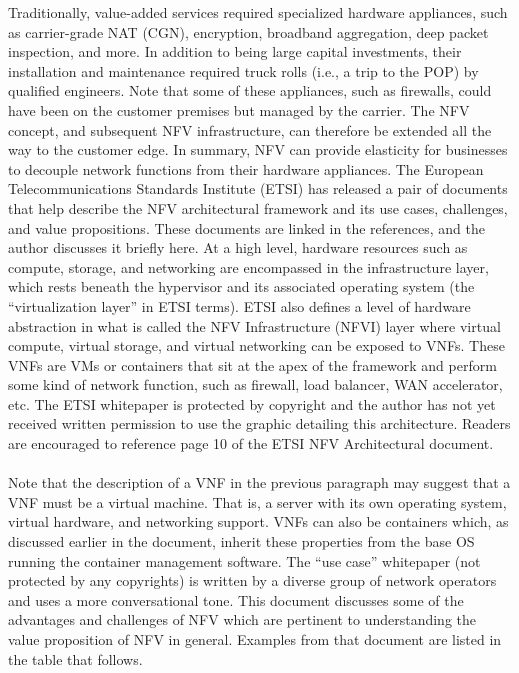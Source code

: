 Traditionally, value-added services required specialized hardware appliances,
such as carrier-grade NAT (CGN), encryption, broadband aggregation, deep
packet inspection, and more. In addition to being large capital investments,
their installation and maintenance required truck rolls (i.e., a trip to the
POP) by qualified engineers. Note that some of these appliances, such as
firewalls, could have been on the customer premises but managed by the
carrier. The NFV concept, and subsequent NFV infrastructure, can therefore be
extended all the way to the customer edge. In summary, NFV can provide
elasticity for businesses to decouple network functions from their hardware
appliances. The European Telecommunications Standards Institute (ETSI) has
released a pair of documents that help describe the NFV architectural
framework and its use cases, challenges, and value propositions. These
documents are linked in the references, and the author discusses it briefly
here. At a high level, hardware resources such as compute, storage, and
networking are encompassed in the infrastructure layer, which rests beneath
the hypervisor and its associated operating system (the ``virtualization layer''
in ETSI terms). ETSI also defines a level of hardware abstraction in what is
called the NFV Infrastructure (NFVI) layer where virtual compute, virtual
storage, and virtual networking can be exposed to VNFs. These VNFs are VMs or
containers that sit at the apex of the framework and perform some kind of
network function, such as firewall, load balancer, WAN accelerator, etc. The
ETSI whitepaper is protected by copyright and the author has not yet received
written permission to use the graphic detailing this architecture. Readers are
encouraged to reference page 10 of the ETSI NFV Architectural document.
\\ \\
Note that the description of a VNF in the previous paragraph may suggest that
a VNF must be a virtual machine. That is, a server with its own operating
system, virtual hardware, and networking support. VNFs can also be containers
which, as discussed earlier in the document, inherit these properties from the
base OS running the container management software. The ``use case'' whitepaper
(not protected by any copyrights) is written by a diverse group of network
operators and uses a more conversational tone. This document discusses some of
the advantages and challenges of NFV which are pertinent to understanding the
value proposition of NFV in general. Examples from that document are listed
in the table that follows.

